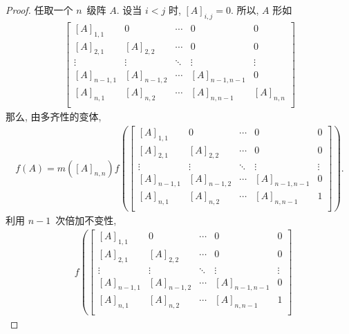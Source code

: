 \documentclass[../libro.tex]{subfiles}
\begin{document}
\begin{proof}
    任取一个 \(n\)~级阵 \(A\).
    设当 \(i < j\) 时, \([A]_{i,j} = 0\).
    所以, \(A\) 形如
    \begin{align*}
        \begin{bmatrix}
            [A]_{1,1}   & 0           & \cdots & 0             & 0         \\
            [A]_{2,1}   & [A]_{2,2}   & \cdots & 0             & 0         \\
            \vdots      & \vdots      & \ddots & \vdots        & \vdots    \\
            [A]_{n-1,1} & [A]_{n-1,2} & \cdots & [A]_{n-1,n-1} & 0         \\
            [A]_{n,1}   & [A]_{n,2}   & \cdots & [A]_{n,n-1}   & [A]_{n,n} \\
        \end{bmatrix}
    \end{align*}
    那么, 由多齐性的变体,
    \begin{align*}
        f(A) = m([A]_{n,n})
        f\left(
            \begin{bmatrix}
                [A]_{1,1}   & 0           & \cdots & 0             & 0      \\
                [A]_{2,1}   & [A]_{2,2}   & \cdots & 0             & 0      \\
                \vdots      & \vdots      & \ddots & \vdots        & \vdots \\
                [A]_{n-1,1} & [A]_{n-1,2} & \cdots & [A]_{n-1,n-1} & 0      \\
                [A]_{n,1}   & [A]_{n,2}   & \cdots & [A]_{n,n-1}   & 1      \\
            \end{bmatrix}
        \right).
    \end{align*}
    利用 \(n-1\)~次倍加不变性,
    \begin{align*}
        &
        f\left(
            \begin{bmatrix}
                [A]_{1,1}   & 0           & \cdots & 0             & 0      \\
                [A]_{2,1}   & [A]_{2,2}   & \cdots & 0             & 0      \\
                \vdots      & \vdots      & \ddots & \vdots        & \vdots \\
                [A]_{n-1,1} & [A]_{n-1,2} & \cdots & [A]_{n-1,n-1} & 0      \\
                [A]_{n,1}   & [A]_{n,2}   & \cdots & [A]_{n,n-1}   & 1      \\

\end{bmatrix}
\end{align*}
\end{proof}
\end{document}

